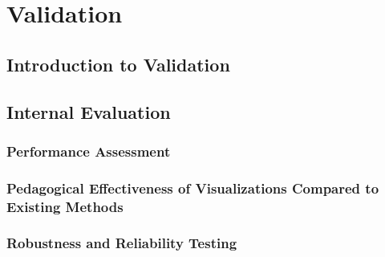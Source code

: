 \chapter{Validation}

\section{Introduction to Validation}

\section{Internal Evaluation}

\subsection{Performance Assessment}

\subsection{Pedagogical Effectiveness of Visualizations Compared to Existing Methods}

\subsection{Robustness and Reliability Testing}

